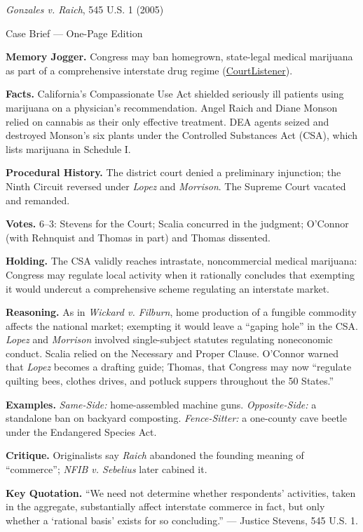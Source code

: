 \documentclass[12pt]{article}
\begin{document}
\begin{center}
{\Large \textit{Gonzales v. Raich}, 545 U.S. 1 (2005)\par}
\vspace{0.3em}
{\normalsize Case Brief --- One-Page Edition\par}
\end{center}

\textbf{Memory Jogger.} Congress may ban homegrown, state-legal medical marijuana as part of a comprehensive interstate drug regime (\href{https://www.courtlistener.com/opinion/799995/gonzales-v-raich/}{CourtListener}).

\textbf{Facts.} California's Compassionate Use Act shielded seriously ill patients using marijuana on a physician's recommendation. Angel Raich and Diane Monson relied on cannabis as their only effective treatment. DEA agents seized and destroyed Monson's six plants under the Controlled Substances Act (CSA), which lists marijuana in Schedule I.

\textbf{Procedural History.} The district court denied a preliminary injunction; the Ninth Circuit reversed under \textit{Lopez} and \textit{Morrison}. The Supreme Court vacated and remanded.

\textbf{Votes.} 6--3: Stevens for the Court; Scalia concurred in the judgment; O'Connor (with Rehnquist and Thomas in part) and Thomas dissented.

\textbf{Holding.} The CSA validly reaches intrastate, noncommercial medical marijuana: Congress may regulate local activity when it rationally concludes that exempting it would undercut a comprehensive scheme regulating an interstate market.

\textbf{Reasoning.} As in \textit{Wickard v. Filburn}, home production of a fungible commodity affects the national market; exempting it would leave a ``gaping hole'' in the CSA. \textit{Lopez} and \textit{Morrison} involved single-subject statutes regulating noneconomic conduct. Scalia relied on the Necessary and Proper Clause. O'Connor warned that \textit{Lopez} becomes a drafting guide; Thomas, that Congress may now ``regulate quilting bees, clothes drives, and potluck suppers throughout the 50 States.''

\textbf{Examples.} \emph{Same-Side:} home-assembled machine guns. \emph{Opposite-Side:} a standalone ban on backyard composting. \emph{Fence-Sitter:} a one-county cave beetle under the Endangered Species Act.

\textbf{Critique.} Originalists say \textit{Raich} abandoned the founding meaning of ``commerce''; \textit{NFIB v. Sebelius} later cabined it.

\textbf{Key Quotation.} ``We need not determine whether respondents' activities, taken in the aggregate, substantially affect interstate commerce in fact, but only whether a `rational basis' exists for so concluding.'' --- Justice Stevens, 545 U.S. 1.
\end{document}
